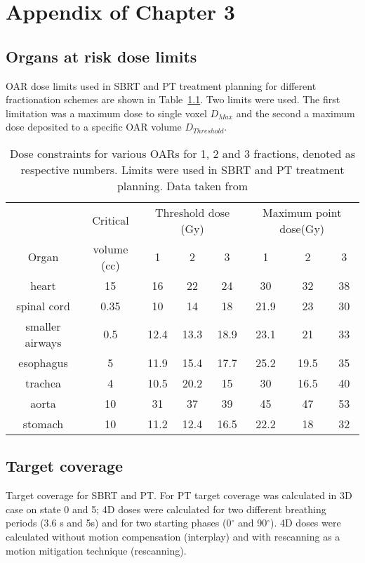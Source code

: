 \documentclass[type=dr, dr=rernat, accentcolor=tud7b,colorbacktitle, bigchapter, openright, twoside, 12pt ]{tudthesis}
\begin{document}
\chapter{Appendix of Chapter 3}

\section{Organs at risk dose limits}

OAR dose limits used in SBRT and PT treatment planning for different fractionation schemes are shown in Table~\ref{tab:oarlimits}. Two limits were used. The first limitation was a maximum dose to single voxel $D_{Max}$ and the second a maximum dose deposited to a 
specific OAR volume $D_{Threshold}$.

\begin{table}[H]
  \centering
  \caption{Dose constraints for various OARs for 1, 2 and 3 fractions, denoted as respective numbers. Limits were used in SBRT and PT treatment planning. Data taken from \cite{Benedict2010}}
  \begin{tabular}{c|c|c|c|c|c|c|c}
   & Critical  & \multicolumn{3}{c}{Threshold dose (Gy)} & \multicolumn{3}{|c}{Maximum point dose(Gy)}  \\
  Organ & volume (cc) & 1 & 2 & 3 & 1 & 2 & 3 \\
   \hline
   heart & 15 & 16 & 22 & 24 & 30 & 32 & 38\\
spinal cord & 0.35 & 10 & 14 & 18 & 21.9 & 23 & 30\\
smaller airways & 0.5 & 12.4 & 13.3 & 18.9 & 23.1 & 21 & 33\\
esophagus & 5 & 11.9 & 15.4 & 17.7 & 25.2 & 19.5 & 35\\
trachea & 4 & 10.5 & 20.2 & 15 & 30 & 16.5 & 40\\
aorta & 10 & 31 & 37 & 39 & 45 & 47 & 53\\
stomach & 10 & 11.2 & 12.4 & 16.5 & 22.2 & 18 & 32\\
\hline\hline
  
  \end{tabular}
  \label{tab:oarlimits}
\end{table}

\section{Target coverage}

Target coverage for SBRT and PT. For PT target coverage was calculated in 3D case on state 0 and 5; 4D doses were calculated for two different breathing periods (3.6 s and 5s)
and for two starting phases (0$^\circ$ and 90$^\circ$). 4D doses were calculated without motion compensation (interplay) and with rescanning as a motion mitigation technique (rescanning).
\end{document}
